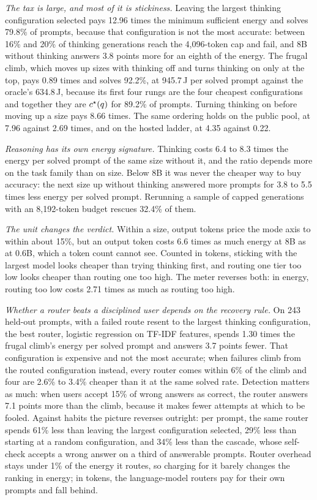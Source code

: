 \emph{The tax is large, and most of it is stickiness.} Leaving the largest
thinking configuration selected pays 12.96 times the minimum sufficient
energy and solves 79.8\% of prompts, because that configuration is not the
most accurate: between 16\% and 20\% of thinking generations reach the
4{,}096-token cap and fail, and 8B without thinking answers 3.8 points more
for an eighth of the energy. The frugal climb, which moves up sizes with
thinking off and turns thinking on only at the top, pays 0.89 times and
solves 92.2\%, at 945.7\,J per solved prompt against the oracle's 634.8\,J,
because its first four rungs are the four cheapest configurations and
together they are $c^{\star}(q)$ for 89.2\% of prompts. Turning thinking on
before moving up a size pays 8.66 times. The same ordering holds on the
public pool, at 7.96 against 2.69 times, and on the hosted ladder, at 4.35
against 0.22.

\emph{Reasoning has its own energy signature.} Thinking costs 6.4 to 8.3
times the energy per solved prompt of the same size without it, and the
ratio depends more on the task family than on size. Below 8B it was never
the cheaper way to buy accuracy: the next size up without thinking answered
more prompts for 3.8 to 5.5 times less energy per solved prompt. Rerunning a
sample of capped generations with an 8{,}192-token budget rescues 32.4\% of
them.

\emph{The unit changes the verdict.} Within a size, output tokens price the
mode axis to within about 15\%, but an output token costs 6.6 times as much
energy at 8B as at 0.6B, which a token count cannot see. Counted in tokens,
sticking with the largest model looks cheaper than trying thinking first,
and routing one tier too low looks cheaper than routing one too high. The
meter reverses both: in energy, routing too low costs 2.71 times as much as
routing too high.

\emph{Whether a router beats a disciplined user depends on the recovery
rule.} On 243 held-out prompts, with a failed route resent to the largest
thinking configuration, the best router, logistic regression on TF-IDF
features, spends 1.30 times the frugal climb's energy per solved prompt and
answers 3.7 points fewer. That configuration is expensive and not the most
accurate; when failures climb from the routed configuration instead, every
router comes within 6\% of the climb and four are 2.6\% to 3.4\% cheaper
than it at the same solved rate. Detection matters as much: when users accept
15\% of wrong answers as correct, the router answers 7.1 points more than the
climb, because it makes fewer attempts at which to be fooled. Against habits
the picture reverses outright: per prompt, the same router spends 61\% less
than leaving the largest configuration selected, 29\% less than starting at a
random configuration, and 34\% less than the cascade, whose self-check
accepts a wrong answer on a third of answerable prompts. Router overhead
stays under 1\% of the energy it routes, so
charging for it barely changes the ranking in energy; in tokens, the
language-model routers pay for their own prompts and fall behind.

